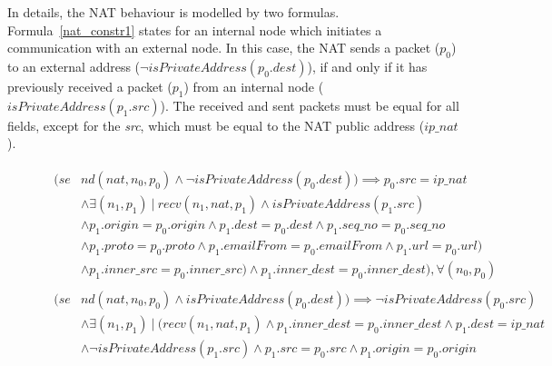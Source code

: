 In details, the NAT behaviour is modelled by two formulas. Formula~\ref{nat_constr1} states for an internal node which initiates a communication with an external node. In this case, the NAT sends a packet (\textit{$p_0$}) to an external address (\textit{$\neg isPrivateAddress(p_{0}.dest)$}), if and only if it has previously received a packet (\textit{$p_1$}) from an internal node (\textit{$isPrivateAddress(p_{1}.src)$}). The received and sent packets must be equal for all fields, except for the \textit{src}, which must be equal to the NAT public address (\textit{$ip\_nat$}).\\


\begin{figure}[h]
	{\footnotesize
		\begin{subequations}
			\begin{align}
			\begin{split}
			\label{nat_constr1}
			(se& nd(nat, n_{0}, p_{0}) \wedge \neg isPrivateAddress(p_{0}.dest)) \implies p_{0}.src = ip\_nat \\
			& \wedge \exists (n_{1}, p_{1}) \: | \: recv(n_{1}, nat, p_{1}) \wedge isPrivateAddress(p_{1}.src) \\
			& \wedge p_{1}.origin = p_{0}.origin \wedge p_{1}.dest = p_{0}.dest \wedge p_{1}.seq\_no = p_{0}.seq\_no \\
			& \wedge p_{1}.proto = p_{0}.proto \wedge p_{1}.emailFrom = p_{0}.emailFrom \wedge p_{1}.url = p_{0}.url) \\
			& \wedge p_{1}.inner\_src = p_{0}.inner\_src) \wedge p_{1}.inner\_dest = p_{0}.inner\_dest), \forall (n_{0}, p_{0})
			\end{split} \\
			\begin{split}
			\label{nat_constr2}
			(se& nd(nat, n_{0}, p_{0}) \wedge isPrivateAddress(p_{0}.dest)) \implies \neg isPrivateAddress(p_{0}.src) \\
			& \wedge \exists  (n_{1}, p_{1}) \: | \: (recv(n_{1}, nat, p_{1})   \wedge p_{1}.inner\_dest = p_{0}.inner\_dest \wedge p_{1}.dest = ip\_nat \\
			& \wedge \neg isPrivateAddress(p_{1}.src) \wedge p_{1}.src = p_{0}.src \wedge p_{1}.origin = p_{0}.origin \\

\end{split}
\end{align}
\end{subequations}}
\end{figure}
